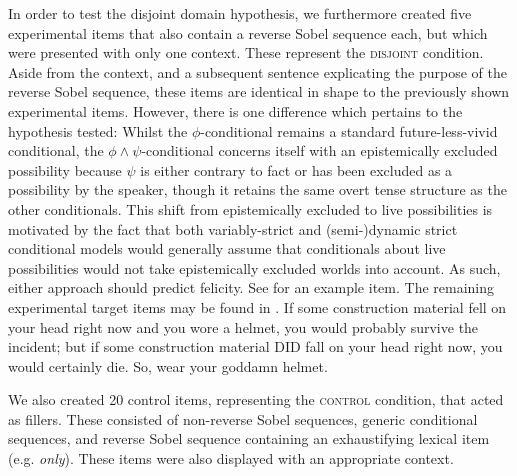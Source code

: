 In order to test the disjoint domain hypothesis, we furthermore created five experimental items that also contain a reverse Sobel sequence each, but which were presented with only one context. These represent the {\scshape disjoint} condition. Aside from the context, and a subsequent sentence explicating the purpose of the reverse Sobel sequence, these items are identical in shape to the previously shown experimental items. However, there is one difference which pertains to the hypothesis tested: Whilst the $\phi$-conditional remains a standard future-less-vivid conditional, the $\phi\land\psi$-conditional concerns itself with an epistemically excluded possibility because $\psi$ is either contrary to fact or has been excluded as a possibility by the speaker, though it retains the same overt tense structure as the other conditionals. This shift from epistemically excluded to live possibilities is motivated by the fact that both variably-strict and (semi-)dynamic strict conditional models would generally assume that conditionals about live possibilities would not take epistemically excluded worlds into account. As such, either approach should predict felicity. See  for an example item. The remaining experimental target items may be found in .
\ex{}
If some construction material fell on your head right now and you wore a helmet, you would probably survive the incident; but if some construction material \MakeUppercase{did} fall on your head right now, you would certainly die. So, wear your goddamn helmet.
\xe

We also created 20 control items, representing the {\scshape control} condition, that acted as fillers. These consisted of non-reverse Sobel sequences, generic conditional sequences, and reverse Sobel sequence containing an exhaustifying lexical item (e.g. \textit{only}). These items were also displayed with an appropriate context.


